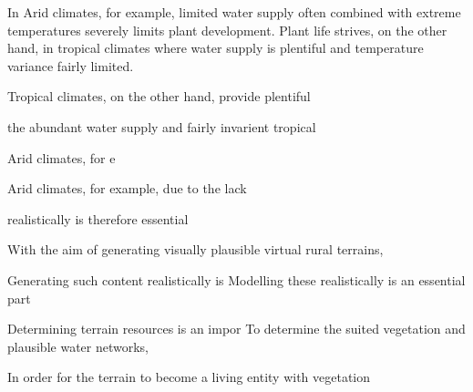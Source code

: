 
In Arid climates, for example, limited water supply often combined with extreme temperatures severely limits plant development. Plant life strives, on the other hand, in tropical climates where water supply is plentiful and temperature variance fairly limited. 


Tropical climates, on the other hand,  provide plentiful 

the abundant water supply and fairly invarient tropical 


Arid climates, for e

Arid climates, for example, due to the lack 


realistically is therefore essential 


With the aim of generating visually plausible virtual rural terrains, 

 Generating such content realistically is   Modelling these realistically is an essential part 

Determining terrain resources is an impor
To determine the suited vegetation and plausible water networks, 

In order for the terrain to become a living entity with vegetation 
